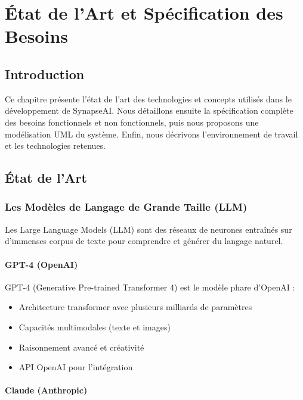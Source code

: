 
\chapter{État de l'Art et Spécification des Besoins}
\label{chap:etatart}

\section{Introduction}

Ce chapitre présente l'état de l'art des technologies et concepts utilisés dans le développement de SynapseAI. Nous détaillons ensuite la spécification complète des besoins fonctionnels et non fonctionnels, puis nous proposons une modélisation UML du système. Enfin, nous décrivons l'environnement de travail et les technologies retenues.

\section{État de l'Art}

\subsection{Les Modèles de Langage de Grande Taille (LLM)}

Les Large Language Models (LLM) sont des réseaux de neurones entraînés sur d'immenses corpus de texte pour comprendre et générer du langage naturel.

\subsubsection{GPT-4 (OpenAI)}

GPT-4 (Generative Pre-trained Transformer 4) est le modèle phare d'OpenAI :
\begin{itemize}
    \item Architecture transformer avec plusieurs milliards de paramètres
    \item Capacités multimodales (texte et images)
    \item Raisonnement avancé et créativité
    \item API OpenAI pour l'intégration
\end{itemize}

\subsubsection{Claude (Anthropic)}

